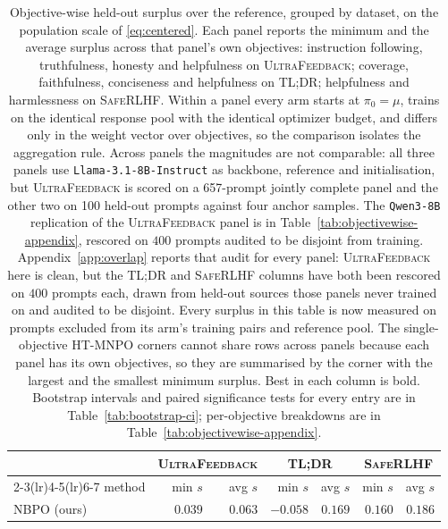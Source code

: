 \documentclass{article}
\theoremstyle{remark}
\theoremstyle{plain}
\newcommand{\NBPO}{\textsc{NBPO}}
\begin{document}
\begin{table}[t]
\centering\scriptsize
\setlength{\tabcolsep}{2.6pt}
\caption{Objective-wise held-out surplus over the reference, grouped by dataset, on the population scale
of \eqref{eq:centered}. Each panel reports the minimum and the average surplus across that panel's own
objectives: instruction following, truthfulness, honesty and helpfulness on \textsc{UltraFeedback};
coverage, faithfulness, conciseness and helpfulness on \textsc{TL;DR}; helpfulness and harmlessness on
\textsc{SafeRLHF}. Within a panel every arm starts at $\pi_0=\mu$, trains on the identical response pool
with the identical optimizer budget, and differs only in the weight vector over objectives, so the
comparison isolates the aggregation rule. Across panels the magnitudes are not comparable:
all three panels use \texttt{Llama-3.1-8B-Instruct} as backbone, reference and initialisation, but
\textsc{UltraFeedback} is scored on a 657-prompt jointly complete panel and the other two on 100 held-out
prompts against four anchor samples. The \texttt{Qwen3-8B} replication of the \textsc{UltraFeedback} panel
is in Table~\ref{tab:objectivewise-appendix}, rescored on $400$ prompts audited to be disjoint from
training. Appendix~\ref{app:overlap} reports that audit for every panel: \textsc{UltraFeedback} here is
clean, but the \textsc{TL;DR} and \textsc{SafeRLHF} columns have both been rescored on $400$ prompts each,
drawn from held-out sources those panels never trained on and audited to be disjoint. Every surplus in
this table is now measured on prompts excluded from its arm's training pairs and reference pool. The single-objective HT-MNPO corners cannot share rows
across panels because each panel has its own objectives, so they are summarised by the corner with the
largest and the smallest minimum surplus. Best in each column is bold. Bootstrap intervals and paired significance tests for every entry are in Table~\ref{tab:bootstrap-ci}; per-objective breakdowns are in Table~\ref{tab:objectivewise-appendix}.}
\label{tab:multi-dataset-surplus}
\begin{tabular}{lrrrrrr}
\toprule
& \multicolumn{2}{c}{\textsc{UltraFeedback}} & \multicolumn{2}{c}{\textsc{TL;DR}} & \multicolumn{2}{c}{\textsc{SafeRLHF}}\\
\cmidrule(lr){2-3}\cmidrule(lr){4-5}\cmidrule(lr){6-7}
method & min $s$ & avg $s$ & min $s$ & avg $s$ & min $s$ & avg $s$\\
\midrule
\NBPO{} (ours) & $\mathbf{0.039}$ & $\mathbf{0.063}$ & $-0.058$ & $\mathbf{0.169}$ & $0.160$ & $0.186$\\

\end{tabular}
\end{table}
\end{document}
